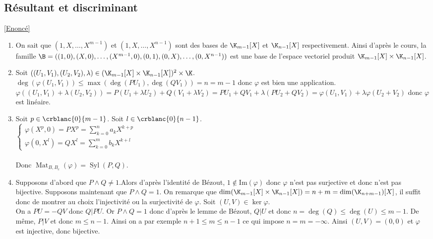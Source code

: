 \documentclass{book}
\begin{document}
	\subsection{Résultant et discriminant }
	\label{Résultant et discriminant corrigé}
	\textcolor{blue}{\hyperref[Résultant et discriminant]{[Enoncé]}}\\
	\begin{enumerate}
		\item On sait que $(1,X,\dots,X^{m-1})$ et $(1,X,\dots,X^{n-1})$ sont des bases de $\K_{m-1}[X]$ et $\K_{n-1}[X]$ respectivement. Ainsi d'après le cours, la famille $\B=((1,0),(X,0),\dots,(X^{m-1},0),(0,1),(0,X),\dots, (0,X^{n-1}))$ est une base de l'espace vectoriel produit $\K_{m-1}[X]\times\K_{n-1}[X]$.
		\item Soit $((U_1,V_1),(U_2,V_2),\lambda)\in (\K_{m-1}[X]\times\K_{n-1}[X])^2\times\K$.\\
		$\deg(\varphi(U_1,V_1))\leq \max(\deg(PU_1),\deg(QV_1))=n=m-1$ donc $\varphi$ est bien une application.\\
		$\varphi((U_1,V_1)+\lambda(U_2,V_2))=P(U_1+\lambda U_2)+Q(V_1+\lambda V_2)=PU_1+QV_1+\lambda(PU_2+QV_2)=\varphi(U_1,V_1)+\lambda\varphi(U_2+V_2)$ donc $\varphi$ est linéaire.
		\item Soit $p\in \crblanc{0}{m-1}$. Soit $l\in \crblanc{0}{n-1}$.\\
		$\begin{cases}
			\varphi(X^p,0)=PX^p=\displaystyle\sum\limits_{k=0}^n a_kX^{k+p}\\
			\varphi(0,X^l)=QX^l=\displaystyle\sum\limits_{k=0}^m b_kX^{k+l}
		\end{cases}$\\\\
		Donc $\operatorname{Mat}_{B,B_c}(\varphi)=\operatorname{Syl}(P,Q)$.
		\item Supposons d'abord que $P\land Q\ne 1$.Alors d'après l'identité de Bézout, $1\notin \text{Im}(\varphi)$ donc $\varphi$ n'est pas surjective et donc n'est pas bijective.
		Supposons maintenant que $P\land Q=1$. On remarque que $\dim(\K_{m-1}[X]\times\K_{n-1}[X])=n+m=\dim(\K_{n+m-1})[X]$, il suffit donc de montrer au choix l'injectivité ou la surjectivité de $\varphi$. Soit $(U,V)\in \ker\varphi$.\\
		On a $PU=-QV$ donc $Q|PU$. Or $P\land Q=1$ donc d'après le lemme de Bézout, $Q|U$ et donc $n=\deg(Q)\leq \deg(U)\leq m-1$. De même, $P|V$ et donc $m\leq n-1$. Ainsi on a par exemple $n+1\leq m\leq n-1$ ce qui impose $n=m=-\infty$. Ainsi $(U,V)=(0,0)$ et $\varphi$ est injective, donc bijective.\\

\end{enumerate}
\end{document}
